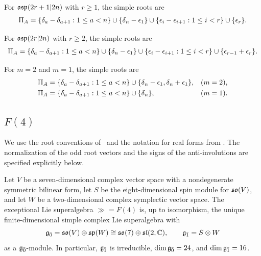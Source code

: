 For ${\mathfrak{osp}}(2r+1\vert2n)$ with $r\geq1$,
the simple roots are
\begin{equation}\label{eq::positive_system_type_A_2}
\begin{aligned}
\Uppi_A
=
\{\delta_a-\delta_{a+1}:1\leq a<n\}\cup\{\delta_n-\epsilon_1\}\cup
\{\epsilon_i-\epsilon_{i+1}:1\leq i<r\}\cup\{\epsilon_r\}.
\end{aligned}
\end{equation}

For ${\mathfrak{osp}}(2r\vert2n)$ with $r\geq2$,
the simple roots are
\begin{equation}\label{eq::positive_system_typeA_3}
\begin{aligned}
\Uppi_A
=
\{\delta_a-\delta_{a+1}:1\leq a<n\}\cup\{\delta_n-\epsilon_1\}\cup
\{\epsilon_i-\epsilon_{i+1}:1\leq i<r\}\cup\{\epsilon_{r-1}+\epsilon_r\}.
\end{aligned}
\end{equation}

For $m=2$ and $m=1$, the simple roots are
\begin{equation}
\begin{aligned}
\Uppi_A
&=
\{\delta_a-\delta_{a+1}:1\leq a<n\}
\cup\{\delta_n-\epsilon_1,\delta_n+\epsilon_1\},
&& (m=2),\\
\Uppi_A
&=
\{\delta_a-\delta_{a+1}:1\leq a<n\}
\cup\{\delta_n\},
&& (m=1).
\end{aligned}
\end{equation}


\subsection{\texorpdfstring{$F(4)$}{F(4)}}
\label{subsec::appendix_F4}

We use the root conventions of~\cite[Chapter~10]{jakobsen1994full}
and the notation for real forms from
\cite[Section~2]{Schmidt_unitary_branching}.
The normalization of the odd root vectors and the signs of
the anti-involutions are specified explicitly below.

Let $V$ be a seven-dimensional complex vector space with a
nondegenerate symmetric bilinear form, let $S$ be the
eight-dimensional spin module for ${\mathfrak{so}}(V)$, and let $W$ be a
two-dimensional complex symplectic vector space. The exceptional
Lie superalgebra $\gg=F(4)$ is, up to isomorphism, the unique
finite-dimensional simple complex Lie superalgebra with
\begin{equation}
{\mathfrak{g}_{\bar{0}}}={\mathfrak{so}}(V)\oplus{\mathfrak{sp}}(W)\cong{\mathfrak{so}}(7)\oplus{\mathfrak{sl}}(2,{\mathbb C}),
\qquad
{\mathfrak{g}_{\bar{1}}}=S\otimes W
\end{equation}
as a ${\mathfrak{g}_{\bar{0}}}$-module. In particular, ${\mathfrak{g}_{\bar{1}}}$ is irreducible,
$\dim{\mathfrak{g}_{\bar{0}}}=24$, and $\dim{\mathfrak{g}_{\bar{1}}}=16$.

